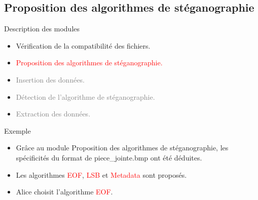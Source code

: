 \documentclass{beamer}
\begin{document}
  \subsection{Proposition des algorithmes de stéganographie}
  \begin{frame} %
	\begin{block}{Description des modules}
	\begin{itemize}
	[circle]
	\item Vérification de la compatibilité des fichiers.
	\item \textcolor{red}{Proposition des algorithmes de stéganographie.}
	\item \textcolor{gray} {Insertion des données.}
	\item \textcolor{gray} {Détection de l'algorithme de stéganographie.}
	\item \textcolor{gray} {Extraction des données.}
	\end{itemize}
	\end{block}
	
	\begin{exampleblock}{Exemple} 
	\begin{itemize}
	[circle]
	\item Grâce au module Proposition des algorithmes de stéganographie, les 
	spécificités du format de piece\_jointe.bmp ont été déduites. 
	\item Les algorithmes \textcolor{red}{EOF}, \textcolor{red}{LSB} et 
	\textcolor{red}{Metadata} sont proposés. 
	\item Alice choisit l'algorithme \textcolor{red}{EOF}. 
	\end{itemize}
	
	\end{exampleblock}
  \end{frame}
  
\end{document}
